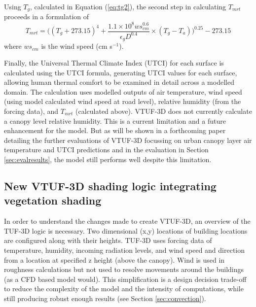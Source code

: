 \documentclass[final,3p,times,authoryear]{elsarticle}
\begin{document}
Using $T_{g}$, calculated in Equation (\ref{eq:tg2}), the second step in calculating $T_{mrt}$ proceeds in a formulation of \cite{Kantor2011} 
\begin{equation}\label{eq:tmrtbucket}
  T_{mrt} = 
  \bigg(
   (T_{g}+273.15)^{4} + 
    \frac{1.1 \times 10^{8}  ws_{cm}^{0.6}}{\epsilon_{g}  D^{0.4}}
    \times 
     (T_{g}-T_{a})
    \bigg)^{0.25} - 273.15
\end{equation}
 where $ws_{cm}$ is the wind speed (cm s$^{-1}$).




Finally, the Universal Thermal Climate Index (UTCI) for each surface is calculated using the \cite{Brode2009u} UTCI formula, generating UTCI values for each surface, allowing human thermal comfort to be examined in detail across a modelled domain. The calculation uses modelled outputs of air temperature, wind speed (using model calculated wind speed at road level), relative humidity (from the forcing data), and $T_{mrt}$ (calculated above). VTUF-3D does not currently calculate a canopy level relative humidity. This is a current limitation and a future enhancement for the model. But as will be shown in a forthcoming paper detailing the further evaluations of VTUF-3D focussing on urban canopy layer air temperature and UTCI predictions and in the evaluation in Section \ref{sec:evalresults}, the model still performs well despite this limitation. 


\subsection{New VTUF-3D shading logic integrating vegetation shading}\label{sec:integration}
In order to understand the changes made to create VTUF-3D, an overview of the TUF-3D logic is necessary. Two dimensional (x,y) locations of building locations are configured along with their heights. TUF-3D uses forcing data of temperature, humidity, incoming radiation levels, and wind speed and direction from a location at specified z height (above the canopy). Wind is used in roughness calculations but not used to resolve movements around the buildings (as a CFD based model would). This simplification is a design decision trade-off to reduce the complexity of the model and the intensity of computations, while still producing robust enough results (see Section \ref{sec:convection}).
\end{document}
